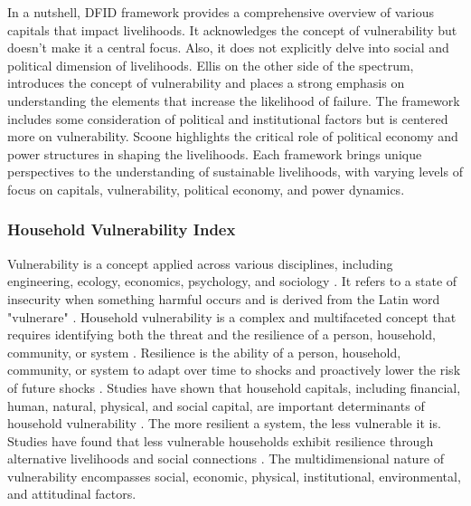 In a nutshell, DFID framework provides a comprehensive overview of various capitals that impact livelihoods. It acknowledges the concept of vulnerability but doesn't make it a central focus. Also, it does not explicitly delve into social and political dimension of livelihoods. Ellis on the other side of the spectrum, introduces the concept of vulnerability and places a strong emphasis on understanding the elements that increase the likelihood of failure. The framework includes some consideration of political and institutional factors but is centered more on vulnerability. Scoone highlights the critical role of political economy and power structures in shaping the livelihoods. Each framework brings unique perspectives to the understanding of sustainable livelihoods, with varying levels of focus on capitals, vulnerability, political economy, and power dynamics.\par

\subsubsection{Household Vulnerability Index}
Vulnerability is a concept applied across various disciplines, including engineering, ecology, economics, psychology, and sociology \citep{fang2016rural}. It refers to a state of insecurity when something harmful occurs \citep{chambers1989editorial, chambers2006vulnerability} and is derived from the Latin word "vulnerare" \citep{calvo2005measuring}. Household vulnerability is a complex and multifaceted concept that requires identifying both the threat and the resilience of a person, household, community, or system \citep{zhang2020capital}. Resilience is the ability of a person, household, community, or system to adapt over time to shocks and proactively lower the risk of future shocks \citep{bernier2014resilience}. Studies have shown that household capitals, including financial, human, natural, physical, and social capital, are important determinants of household vulnerability \citep{gaisie2021complexity, zhang2020capital}. The more resilient a system, the less vulnerable it is. Studies have found that less vulnerable households exhibit resilience through alternative livelihoods and social connections \citep{antwi2013characterising}. The multidimensional nature of vulnerability encompasses social, economic, physical, institutional, environmental, and attitudinal factors\citep{rahman2023households, notenbaert2013derivation}.


